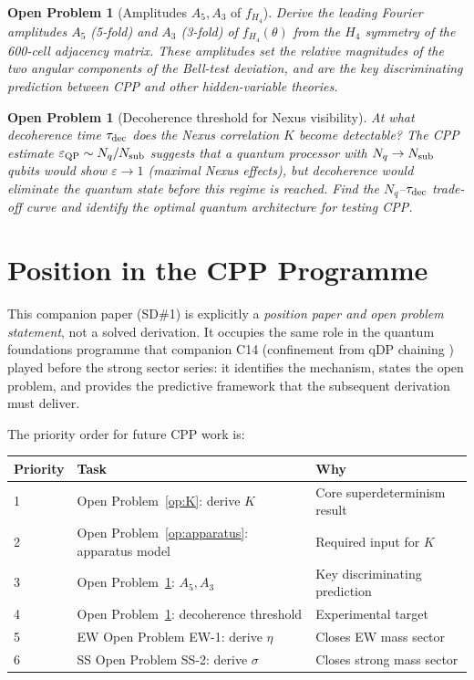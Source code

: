 \documentclass[11pt,letterpaper]{article}
\newtheorem{openprob}[theorem]{Open Problem}
\newcommand{\eps}{\varepsilon}
\begin{document}
\begin{openprob}[Amplitudes $A_5, A_3$ of $f_{H_4}$]
\label{op:amplitudes}
Derive the leading Fourier amplitudes $A_5$ (5-fold) and $A_3$
(3-fold) of $f_{H_4}(\theta)$ from the $H_4$ symmetry of the
600-cell adjacency matrix.  These amplitudes set the relative
magnitudes of the two angular components of the Bell-test deviation,
and are the key discriminating prediction between CPP and other
hidden-variable theories.
\end{openprob}

\begin{openprob}[Decoherence threshold for Nexus visibility]
\label{op:decoherence}
At what decoherence time $\tau_{\rm dec}$ does the Nexus
correlation $K$ become detectable?  The CPP estimate $\eps_{\rm QP}
\sim N_q / N_{\rm sub}$ suggests that a quantum processor with
$N_q \to N_{\rm sub}$ qubits would show $\eps \to 1$ (maximal Nexus
effects), but decoherence would eliminate the quantum state before
this regime is reached.  Find the $N_q$--$\tau_{\rm dec}$ trade-off
curve and identify the optimal quantum architecture for testing
CPP.
\end{openprob}

\section{Position in the CPP Programme}

This companion paper (SD\#1) is explicitly a \emph{position paper and
open problem statement}, not a solved derivation.  It occupies the
same role in the quantum foundations programme that companion C14
(confinement from qDP chaining \citep{c14}) played before the strong
sector series: it identifies the mechanism, states the open problem,
and provides the predictive framework that the subsequent derivation
must deliver.

The priority order for future CPP work is:

\begin{center}
\begin{tabular}{@{}lll@{}}
\toprule
Priority & Task & Why \\
\midrule
1 & Open Problem~\ref{op:K}: derive $K$ & Core superdeterminism result \\
2 & Open Problem~\ref{op:apparatus}: apparatus model & Required input for $K$ \\
3 & Open Problem~\ref{op:amplitudes}: $A_5, A_3$ & Key discriminating prediction \\
4 & Open Problem~\ref{op:decoherence}: decoherence threshold & Experimental target \\
5 & EW Open Problem EW-1: derive $\eta$ & Closes EW mass sector \\
6 & SS Open Problem SS-2: derive $\sigma$ & Closes strong mass sector \\
\bottomrule
\end{tabular}
\end{center}
\end{document}
